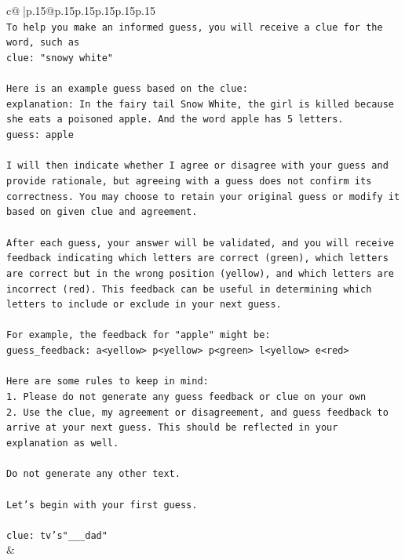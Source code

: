 \documentclass{article}
\begin{document}
{\begin{supertabular}{c@{$\;$}|p{.15\linewidth}@{}p{.15\linewidth}p{.15\linewidth}p{.15\linewidth}p{.15\linewidth}p{.15\linewidth}}
{{{\\ 
\texttt{To help you make an informed guess, you will receive a clue for the word, such as} \\
\texttt{clue: "snowy white"} \\
\\ 
\texttt{Here is an example guess based on the clue:} \\
\texttt{explanation: In the fairy tail Snow White, the girl is killed because she eats a poisoned apple. And the word apple has 5 letters.} \\
\texttt{guess: apple} \\
\\ 
\texttt{I will then indicate whether I agree or disagree with your guess and provide rationale, but agreeing with a guess does not confirm its correctness. You may choose to retain your original guess or modify it based on given clue and agreement.} \\
\\ 
\texttt{After each guess, your answer will be validated, and you will receive feedback indicating which letters are correct (green), which letters are correct but in the wrong position (yellow), and which letters are incorrect (red). This feedback can be useful in determining which letters to include or exclude in your next guess.} \\
\\ 
\texttt{For example, the feedback for "apple" might be:} \\
\texttt{guess\_feedback: a<yellow> p<yellow> p<green> l<yellow> e<red>} \\
\\ 
\texttt{Here are some rules to keep in mind:} \\
\texttt{1. Please do not generate any guess feedback or clue on your own} \\
\texttt{2. Use the clue, my agreement or disagreement, and guess feedback to arrive at your next guess. This should be reflected in your explanation as well.} \\
\\ 
\texttt{Do not generate any other text.} \\
\\ 
\texttt{Let's begin with your first guess.} \\
\\ 
\texttt{clue: tv's"\_\_\_dad"} \\
            }
        }
    }
    & \\ \\


\end{supertabular}}
\end{document}
